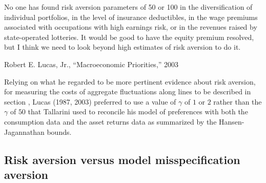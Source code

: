 \epigraph{No one has found risk aversion parameters of 50 or 100
in the diversification of individual portfolios, in the level of
insurance deductibles, in the wage premiums associated with
occupations with high earnings risk, or in the revenues raised by
state-operated lotteries. It would be good to have the equity
premium resolved, but I think we need to look beyond high
estimates of risk aversion to do it.} {Robert E. Lucas, Jr., ``Macroeconomic Priorities,'' 2003}

Relying on  what he regarded to be  more pertinent evidence about risk aversion, for  measuring the costs of aggregate fluctuations
along lines to be described in section , Lucas (1987, 2003) preferred to use a value of $\gamma$ of $1$ or $2$ rather than
the $\gamma$ of $50$ that Tallarini used to reconcile his model of preferences with  both the consumption data  and the asset returns data
as summarized by the Hansen-Jagannathan bounds.
%
%
%
%

\subsection{Risk aversion versus model misspecification aversion}


